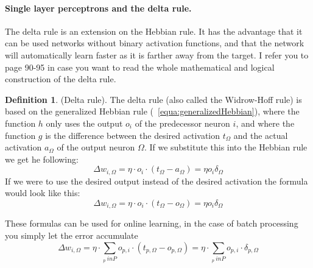 \documentclass[pdftex,a4paper,12pt,twoside]{report}
\theoremstyle{plain} \newtheorem{theorem}{Theorem} \newtheorem{proposition}{Proposition} \newtheorem{lemma}{Lemma} \newtheorem*{corollary}{Corollary}
\theoremstyle{definition} \newtheorem{definition}{Definition} \newtheorem{conjecture}{Conjecture} \newtheorem*{example}{Example} \newtheorem{algorithm}{Algorithm}
\theoremstyle{remark} \newtheorem*{remark}{Remark} \newtheorem*{note}{Note} \newtheorem{case}{Case}
\begin{document}
\paragraph{Single layer perceptrons and the delta rule.}
The delta rule is an extension on the Hebbian rule. It has the advantage that it can be used networks without binary activation functions, and that the network will automatically learn faster as it is farther away from the target. I refer you to \citep{Kriesel2013} page 90-95 in case you want to read the whole mathematical and logical construction of the delta rule.
\begin{definition}
(Delta rule). The delta rule (also called the Widrow-Hoff rule) is based on the generalized Hebbian rule (~\ref{equa:generalizedHebbian}), where the function $h$ only uses the output $o_i$ of the predecessor neuron $i$, and where the function $g$ is the difference between the desired activation $t_\Omega$ and the actual activation $a_\Omega$ of the output neuron $\Omega$. If we substitute this into the Hebbian rule we get he following:
\begin{equation}
\Delta w_{i,\Omega} = \eta \cdot o_i \cdot (t_\Omega - a_\Omega) = \eta o_i \delta_\Omega
\end{equation}
\label{equa:deltaSLP}
If we were to use the desired output instead of the desired activation the formula would look like this:
\begin{equation}
\Delta w_{i,\Omega} = \eta \cdot o_i \cdot (t_\Omega - o_\Omega) = \eta o_i \delta_\Omega
\end{equation}
\end{definition}
These formulas can be used for online learning, in the case of batch processing you simply let the error accumulate
\begin{equation}
\Delta w_{i,\Omega} = \eta \cdot \sum_{_{p} \ in P} o_{p,i} \cdot (t_{p,\Omega} - o_{p,\Omega}) = \eta \cdot \sum_{_{p} \ in P} o_{p,i} \cdot \delta_{p,\Omega}
\end{equation}
\end{document}
